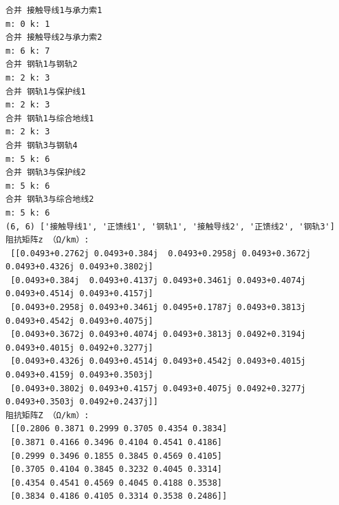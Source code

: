 \documentclass[11pt]{article}
\begin{document}
    \begin{Verbatim}[commandchars=\\\{\}]
合并 接触导线1与承力索1
m: 0 k: 1
合并 接触导线2与承力索2
m: 6 k: 7
合并 钢轨1与钢轨2
m: 2 k: 3
合并 钢轨1与保护线1
m: 2 k: 3
合并 钢轨1与综合地线1
m: 2 k: 3
合并 钢轨3与钢轨4
m: 5 k: 6
合并 钢轨3与保护线2
m: 5 k: 6
合并 钢轨3与综合地线2
m: 5 k: 6
(6, 6) ['接触导线1', '正馈线1', '钢轨1', '接触导线2', '正馈线2', '钢轨3']
阻抗矩阵z （Ω/km）: 
 [[0.0493+0.2762j 0.0493+0.384j  0.0493+0.2958j 0.0493+0.3672j 0.0493+0.4326j 0.0493+0.3802j]
 [0.0493+0.384j  0.0493+0.4137j 0.0493+0.3461j 0.0493+0.4074j 0.0493+0.4514j 0.0493+0.4157j]
 [0.0493+0.2958j 0.0493+0.3461j 0.0495+0.1787j 0.0493+0.3813j 0.0493+0.4542j 0.0493+0.4075j]
 [0.0493+0.3672j 0.0493+0.4074j 0.0493+0.3813j 0.0492+0.3194j 0.0493+0.4015j 0.0492+0.3277j]
 [0.0493+0.4326j 0.0493+0.4514j 0.0493+0.4542j 0.0493+0.4015j 0.0493+0.4159j 0.0493+0.3503j]
 [0.0493+0.3802j 0.0493+0.4157j 0.0493+0.4075j 0.0492+0.3277j 0.0493+0.3503j 0.0492+0.2437j]]
阻抗矩阵Z （Ω/km）: 
 [[0.2806 0.3871 0.2999 0.3705 0.4354 0.3834]
 [0.3871 0.4166 0.3496 0.4104 0.4541 0.4186]
 [0.2999 0.3496 0.1855 0.3845 0.4569 0.4105]
 [0.3705 0.4104 0.3845 0.3232 0.4045 0.3314]
 [0.4354 0.4541 0.4569 0.4045 0.4188 0.3538]
 [0.3834 0.4186 0.4105 0.3314 0.3538 0.2486]]

    \end{Verbatim}


    
    
    
    
\end{document}
